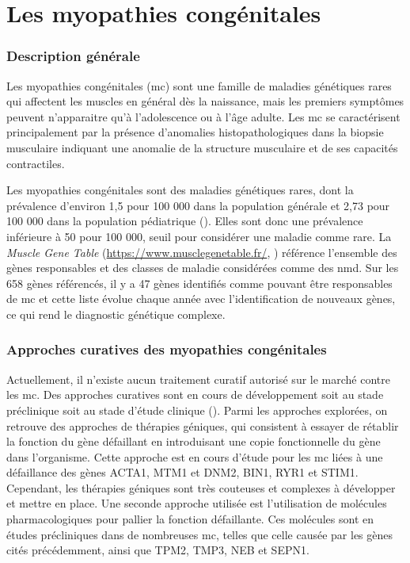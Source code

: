 \section{Les myopathies congénitales}
\subsubsection{Description générale}
Les myopathies congénitales (\gls{mc}) sont une famille de maladies génétiques rares qui affectent les muscles en général dès la naissance, mais les premiers symptômes peuvent n'apparaitre qu'à l'adolescence ou à l'âge adulte. Les \gls{mc} se caractérisent principalement par la présence d'anomalies histopathologiques dans la biopsie musculaire indiquant une anomalie de la structure musculaire et de ses capacités contractiles.

Les myopathies congénitales sont des maladies génétiques rares, dont la prévalence d'environ 1,5 pour 100 000 dans la population générale et 2,73 pour 100 000 dans la population pédiatrique (\cite{huang_systematic_2021}). Elles sont donc une prévalence inférieure à 50 pour 100 000, seuil pour considérer une maladie comme rare. La \textit{Muscle Gene Table} (\url{https://www.musclegenetable.fr/}, \cite{benarroch_2023_2023}) référence l'ensemble des gènes responsables et des classes de maladie considérées comme des \gls{nmd}. Sur les 658 gènes référencés, il y a 47 gènes identifiés comme pouvant être responsables de \gls{mc} et cette liste évolue chaque année avec l'identification de nouveaux gènes, ce qui rend le diagnostic génétique complexe. 

\subsubsection{Approches curatives des myopathies congénitales}
Actuellement, il n'existe aucun traitement curatif autorisé sur le marché contre les \gls{mc}. Des approches curatives sont en cours de développement soit au stade préclinique soit au stade d'étude clinique (\cite{gineste_therapeutic_2023, guan_gene_2016}). Parmi les approches explorées, on retrouve des approches de thérapies géniques, qui consistent à essayer de rétablir la fonction du gène défaillant en introduisant une copie fonctionnelle du gène dans l'organisme. Cette approche est en cours d'étude pour les \gls{mc} liées à une défaillance des gènes ACTA1, MTM1 et DNM2, BIN1, RYR1 et STIM1. Cependant, les thérapies géniques sont très couteuses et complexes à développer et mettre en place. Une seconde approche utilisée est l'utilisation de molécules pharmacologiques pour pallier la fonction défaillante. Ces molécules sont en études précliniques dans de nombreuses \gls{mc}, telles que celle causée par les gènes cités précédemment, ainsi que TPM2, TMP3, NEB et SEPN1. 

